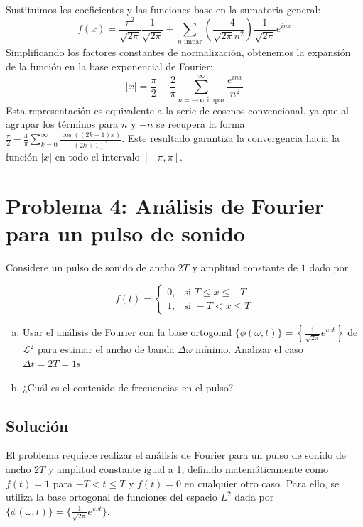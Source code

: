 \documentclass[a4paper]{article}
\begin{document}
Sustituimos los coeficientes y las funciones base en la sumatoria general:
\begin{equation}
f(x) = \frac{\pi^2}{\sqrt{2\pi}} \frac{1}{\sqrt{2\pi}} + \sum_{n \text{ impar}} \left( \frac{-4}{\sqrt{2\pi} n^2} \right) \frac{1}{\sqrt{2\pi}} e^{inx}
\end{equation}
Simplificando los factores constantes de normalización, obtenemos la expansión de la función en la base exponencial de Fourier:
\begin{equation}
|x| = \frac{\pi}{2} - \frac{2}{\pi} \sum_{n=-\infty, \text{impar}}^{\infty} \frac{e^{inx}}{n^2}
\end{equation}
Esta representación es equivalente a la serie de cosenos convencional, ya que al agrupar los términos para $n$ y $-n$ se recupera la forma $\frac{\pi}{2} - \frac{4}{\pi} \sum_{k=0}^{\infty} \frac{\cos((2k+1)x)}{(2k+1)^2}$. Este resultado garantiza la convergencia hacia la función $|x|$ en todo el intervalo $[-\pi, \pi]$.




\section{Problema 4: Análisis de Fourier para un pulso de sonido}

Considere un pulso de sonido de ancho $2T$ y amplitud constante de $1$ dado por

$$
f(t) =
\begin{cases}
0, & \text{si }  T \leq x \leq -T \\
1, & \text{si } -T < x \leq T
\end{cases}
$$

\begin{enumerate}[a.]
	\item Usar el análisis de Fourier con la base ortogonal $\{\phi(\omega, t)\} = \left\{\frac{1}{\sqrt{2\pi}}e^{i \omega t}\right\}$ de $\mathscr{L}^2$ para estimar el ancho de banda $\Delta \omega$ mínimo. Analizar el caso $\Delta t = 2T=1\text{s}$
	\item ¿Cuál es el contenido de frecuencias en el pulso? 
	
\end{enumerate}



\subsection{Solución}

El problema requiere realizar el análisis de Fourier para un pulso de sonido de ancho $2T$ y amplitud constante igual a 1, definido matemáticamente como $f(t) = 1$ para $-T < t \leq T$ y $f(t) = 0$ en cualquier otro caso. Para ello, se utiliza la base ortogonal de funciones del espacio $L^2$ dada por $\{\phi(\omega, t)\} = \{ \frac{1}{\sqrt{2\pi}} e^{i\omega t} \}$.
\end{document}
